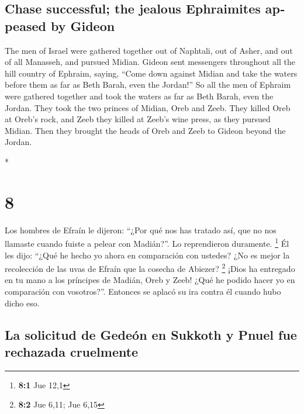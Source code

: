 \begin{paracol}{2}
\begin{otherlanguage}{english}
\hypertarget{chase-successful-the-jealous-ephraimites-appeased-by-gideon}{%
\subsection{Chase successful; the jealous Ephraimites appeased by
Gideon}\label{chase-successful-the-jealous-ephraimites-appeased-by-gideon}}

 The men of Israel were gathered together out of
Naphtali, out of Asher, and out of all Manasseh, and pursued Midian.
 Gideon sent messengers throughout all the hill country
of Ephraim, saying, ``Come down against Midian and take the waters
before them as far as Beth Barah, even the Jordan!'' So all the men of
Ephraim were gathered together and took the waters as far as Beth Barah,
even the Jordan.  They took the two princes of Midian,
Oreb and Zeeb. They killed Oreb at Oreb's rock, and Zeeb they killed at
Zeeb's wine press, as they pursued Midian. Then they brought the heads
of Oreb and Zeeb to Gideon beyond the Jordan.

\end{otherlanguage}

\switchcolumn[0]*

\hypertarget{section-14}{%
\section{8}\label{section-14}}

 Los hombres de Efraín le dijeron: ``¿Por qué nos has
tratado así, que no nos llamaste cuando fuiste a pelear con Madián?''.
Lo reprendieron duramente. \footnote{\textbf{8:1} Jue 12,1}
 Él les dijo: ``¿Qué he hecho yo ahora en comparación con
ustedes? ¿No es mejor la recolección de las uvas de Efraín que la
cosecha de Abiezer? \footnote{\textbf{8:2} Jue 6,11; Jue 6,15}
 ¡Dios ha entregado en tu mano a los príncipes de Madián,
Oreb y Zeeb! ¿Qué he podido hacer yo en comparación con vosotros?''.
Entonces se aplacó su ira contra él cuando hubo dicho eso.

\hypertarget{la-solicitud-de-gedeuxf3n-en-sukkoth-y-pnuel-fue-rechazada-cruelmente}{%
\subsection{La solicitud de Gedeón en Sukkoth y Pnuel fue rechazada
cruelmente}\label{la-solicitud-de-gedeuxf3n-en-sukkoth-y-pnuel-fue-rechazada-cruelmente}}


\end{paracol}
